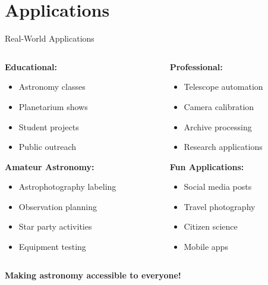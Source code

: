 \documentclass[aspectratio=169]{beamer}
\begin{document}
\section{Applications}

\begin{frame}{Real-World Applications}
\begin{columns}
\begin{column}{0.5\textwidth}
\textbf{Educational:}
\begin{itemize}
\item Astronomy classes
\item Planetarium shows  
\item Student projects
\item Public outreach
\end{itemize}

\textbf{Amateur Astronomy:}
\begin{itemize}
\item Astrophotography labeling
\item Observation planning
\item Star party activities
\item Equipment testing
\end{itemize}
\end{column}

\begin{column}{0.5\textwidth}
\textbf{Professional:}
\begin{itemize}
\item Telescope automation
\item Camera calibration
\item Archive processing
\item Research applications
\end{itemize}

\textbf{Fun Applications:}
\begin{itemize}
\item Social media posts
\item Travel photography
\item Citizen science
\item Mobile apps
\end{itemize}
\end{column}
\end{columns}

\vspace{0.5cm}
\begin{center}
\textcolor{starblue}{\textbf{Making astronomy accessible to everyone!}}
\end{center}
\end{frame}
\end{document}
